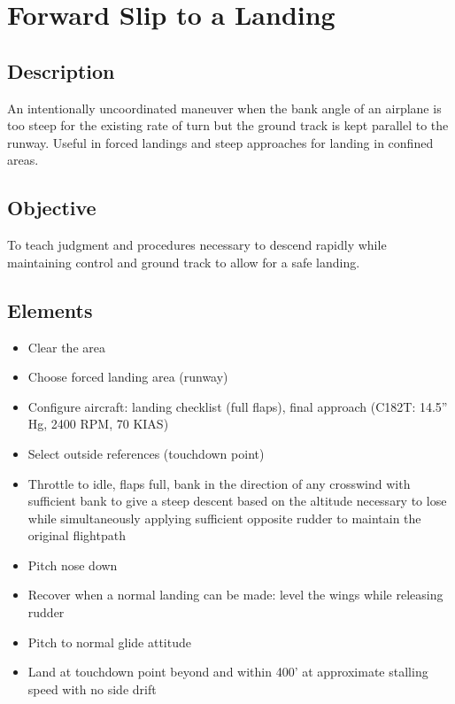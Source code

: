\section{Forward Slip to a Landing}

\subsection{Description}

An intentionally uncoordinated maneuver when the bank angle of an airplane is
too steep for the existing rate of turn but the ground track is kept parallel
to the runway. Useful in forced landings and steep approaches for landing in
confined areas.

\subsection{Objective}

To teach judgment and procedures necessary to descend rapidly while maintaining
control and ground track to allow for a safe landing.

\subsection{Elements}

\begin{itemize}
  \item Clear the area
  \item Choose forced landing area (runway)
  \item Configure aircraft: landing checklist (full flaps), final
    approach (C182T: 14.5'' Hg, 2400 RPM, 70 KIAS)
  \item Select outside references (touchdown point)
  \item Throttle to idle, flaps full, bank in the direction of any crosswind
    with sufficient bank to give a steep descent based on the altitude
    necessary to lose while simultaneously applying sufficient opposite rudder
    to maintain the original flightpath
  \item Pitch nose down
  \item Recover when a normal landing can be made: level the wings while
    releasing rudder
  \item Pitch to normal glide attitude
  \item Land at touchdown point beyond and within 400’
    at approximate stalling speed with no side drift
\end{itemize}

